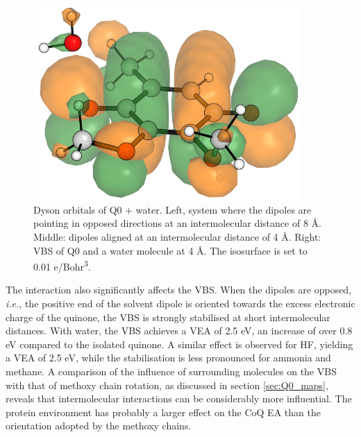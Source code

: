 \begin{figure}[h]
\begin{minipage}[b]{0.3\textwidth}
  \end{minipage}
  \hfill
  \begin{minipage}[b]{0.3\textwidth}
    \centering
    \includegraphics[width=0.9\textwidth]{chapters/results/image/Q0_H2O_VBS.png}
  \end{minipage}
  \caption[Dyson orbitals of Q0+water]{Dyson orbitals of Q0 + water. Left, system where the dipoles are pointing in opposed directions at an intermolecular distance of 8 \r{A}. Middle: dipoles aligned at an intermolecular distance of 4 \r{A}. Right: VBS of Q0 and a water molecule at 4 \r{A}. The isosurface is set to 0.01 e/Bohr\textsuperscript{3}.}
  \label{fig:Q0_H2O_dyson}
\end{figure}

The interaction also significantly affects the VBS. When the dipoles are opposed, \textit{i.e.}, the positive end of the solvent dipole is oriented towards the excess electronic charge of the quinone, the VBS is strongly stabilised at short intermolecular distances. With water, the VBS achieves a VEA of 2.5 eV, an increase of over 0.8 eV compared to the isolated quinone. A similar effect is observed for HF, yielding a VEA of 2.5 eV, while the stabilisation is less pronounced for ammonia and methane. A comparison of the influence of surrounding molecules on the VBS with that of methoxy chain rotation, as discussed in section \ref{sec:Q0_maps}, reveals that intermolecular interactions can be considerably more influential. The protein environment has probably a larger effect on the CoQ EA than the orientation adopted by the methoxy chains.


